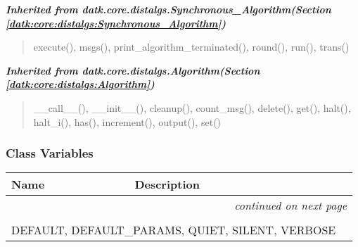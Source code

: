 \large{\textbf{\textit{Inherited from datk.core.distalgs.Synchronous\_Algorithm\textit{(Section \ref{datk:core:distalgs:Synchronous_Algorithm})}}}}

\begin{quote}
execute(), msgs(), print\_algorithm\_terminated(), round(), run(), trans()
\end{quote}

\large{\textbf{\textit{Inherited from datk.core.distalgs.Algorithm\textit{(Section \ref{datk:core:distalgs:Algorithm})}}}}

\begin{quote}
\_\_call\_\_(), \_\_init\_\_(), cleanup(), count\_msg(), delete(), get(), halt(), halt\_i(), has(), increment(), output(), set()
\end{quote}


  \subsubsection{Class Variables}

    \vspace{-1cm}
\hspace{\varindent}\begin{longtable}{|p{\varnamewidth}|p{\vardescrwidth}|l}
\cline{1-2}
\cline{1-2} \centering \textbf{Name} & \centering \textbf{Description}& \\
\cline{1-2}
\endhead\cline{1-2}\multicolumn{3}{r}{\small\textit{continued on next page}}\\\endfoot\cline{1-2}
\endlastfoot\multicolumn{2}{|l|}{\textit{Inherited from datk.core.distalgs.Algorithm \textit{(Section \ref{datk:core:distalgs:Algorithm})}}}\\
\multicolumn{2}{|p{\varwidth}|}{\raggedright DEFAULT, DEFAULT\_PARAMS, QUIET, SILENT, VERBOSE}\\
\cline{1-2}
\end{longtable}



